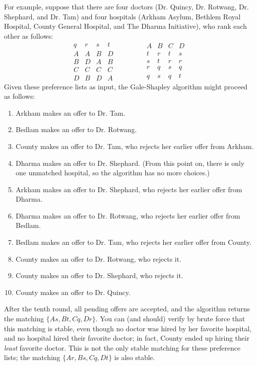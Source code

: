 For example, suppose that there are four doctors (Dr. Quincy, Dr. Rotwang, Dr. Shephard, and Dr. Tam) and four hospitals (Arkham Asylum, Bethlem Royal Hospital, County General Hospital, and The Dharma Initiative), who rank each other as follows:
\[
\begin{array}{cccc}
q & r & s & t\\
\hline
A & A & B & D\\
B & D & A & B\\
C & C & C & C\\
D & B & D & A
\end{array}
\qquad\qquad
\begin{array}{cccc}
A & B & C & D\\
\hline
t & r & t & s\\
s & t & r & r\\
r & q & s & q\\
q & s & q & t
\end{array}
\]
Given these preference lists as input, the Gale-Shapley algorithm might proceed as follows:
\begin{enumerate}
\item Arkham makes an offer to Dr. Tam.
\item Bedlam makes an offer to Dr. Rotwang.
\item County makes an offer to Dr. Tam, who rejects her earlier offer from Arkham.
\item Dharma makes an offer to Dr. Shephard.
(From this point on, there is only one unmatched hospital, so the algorithm has no more choices.)
\item Arkham makes an offer to Dr. Shephard, who rejects her earlier offer from Dharma.
\item Dharma makes an offer to Dr. Rotwang, who rejects her earlier offer from Bedlam.
\item Bedlam makes an offer to Dr. Tam, who rejects her earlier offer from County.
\item County makes an offer to Dr. Rotwang, who rejects it.
\item County makes an offer to Dr. Shephard, who rejects it.
\item County makes an offer to Dr. Quincy.
\end{enumerate}
After the tenth round, all pending offers are accepted, and the algorithm returns the matching $\{As, Bt, Cq, Dr\}$.
You can (and should) verify by brute force that this matching is stable, even though no doctor was hired by her favorite hospital, and no hospital hired their favorite doctor; in fact, County ended up hiring their \textit{least} favorite doctor.
This is not the only stable matching for these preference lists; the matching $\{Ar, Bs, Cq, Dt\}$ is also stable.

